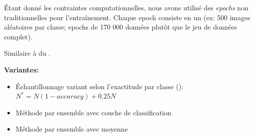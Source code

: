 Étant donné les contraintes computationnelles, nous avons utilisé des \emph{epochs} non traditionnelles pour l'entraînement. 
Chaque epoch consiste en un  (ex: 500 images aléatoires par classe; epochs de 170 000 données plutôt que le jeu de données complet).

Similaire à du  .


\textbf{Variantes:}

\begin{itemize}
\item Échantillonnage variant selon l'exactitude par classe (): $N^*=N(1-accuracy) +0.25N$
\item Méthode par ensemble avec couche de classification
\item Méthode par ensemble avec moyenne
\end{itemize}